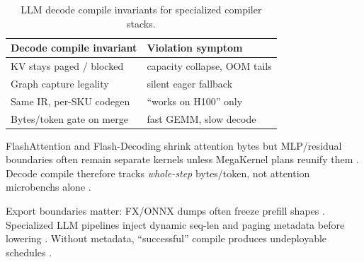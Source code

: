 \begin{table}[t]
\centering
\small
\begin{tabular}{@{}ll@{}}
\toprule
\textbf{Decode compile invariant} & \textbf{Violation symptom} \\
\midrule
KV stays paged / blocked & capacity collapse, OOM tails \\
Graph capture legality & silent eager fallback \\
Same IR, per-SKU codegen & ``works on H100'' only \\
Bytes/token gate on merge & fast GEMM, slow decode \\
\bottomrule
\end{tabular}
\caption{LLM decode compile invariants for specialized compiler stacks.}
\label{tab:ch23_decode_invariants}
\end{table}

FlashAttention and Flash-Decoding shrink attention bytes but MLP/residual boundaries often remain separate kernels unless MegaKernel plans reunify them \citep{dao2022flashattention,dao2023flashdecoding,taxbreak2026,memoryfloor2026,yirage2026,chen2020compilerbasedhardw,kwon2023vllm,patel2025llminference,liu2024deepseekv3,amd2024aie,dlbook,semianalysis2024tma,amd2024xdna,nvidia2024cudagraphs,nvidia2022hopper}. Decode compile therefore tracks \emph{whole-step} bytes/token, not attention microbenchs alone \citep{patel2025llminference,memoryfloor2026,taxbreak2026,yirage2026,chen2020compilerbasedhardw,kwon2023vllm,liu2024deepseekv3,amd2024aie,dlbook,dao2022flashattention,dao2023flashdecoding,nvidia2024cudagraphs,nvidia2022hopper,semianalysis2024tma,amd2024xdna}.

Export boundaries matter: FX/ONNX dumps often freeze prefill shapes \citep{patel2025llminference,kwon2023vllm,yirage2026,chen2020compilerbasedhardw,memoryfloor2026,taxbreak2026,liu2024deepseekv3,amd2024aie,dlbook,dao2022flashattention,dao2023flashdecoding,nvidia2024cudagraphs,nvidia2022hopper,semianalysis2024tma,amd2024xdna}. Specialized LLM pipelines inject dynamic seq-len and paging metadata before lowering \citep{kwon2023vllm,yirage2026,chen2020compilerbasedhardw,patel2025llminference,memoryfloor2026,taxbreak2026,liu2024deepseekv3,amd2024aie,dlbook,dao2022flashattention,dao2023flashdecoding,nvidia2024cudagraphs,nvidia2022hopper,semianalysis2024tma,amd2024xdna}. Without metadata, ``successful'' compile produces undeployable schedules \citep{patel2025llminference,yirage2026,chen2020compilerbasedhardw,kwon2023vllm,liu2024deepseekv3,memoryfloor2026,taxbreak2026,amd2024aie,dlbook,dao2022flashattention,dao2023flashdecoding,nvidia2024cudagraphs,nvidia2022hopper,semianalysis2024tma,amd2024xdna}.

